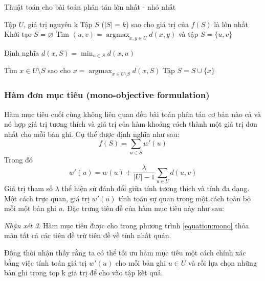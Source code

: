 \documentclass[12pt]{report}
\DeclareMathOperator*{\argmax}{argmax}
\begin{document}
\begin{algorithm}
    \caption{Thuật toán cho bài toán phân tán lớn nhất - nhỏ nhất}
    \label{alg:2}
    \begin{algorithmic}
        \INPUT Tập $U$, giá trị nguyên k 
        \OUTPUT Tập $S$ ($|S|=k$) sao cho giá trị của $f(S)$ là lớn nhất
        \State Khởi tạo $S = \varnothing$
        \State Tìm $(u, v) = \argmax_{x, y \in U} d(x, y)$ 
        và tập $S = \{ u, v\}$

            \State Định nghĩa $d(x, S) = \min_{u \in S} d(x, u)$
        \EndFor

            \State Tìm $x \in U \setminus S$ sao cho
            $x = \argmax_{x \in U \setminus S} d(x, S)$
            \State Tập $S = S \cup \{ x \}$
        \EndWhile
    \end{algorithmic}
\end{algorithm}

\subsubsection{Hàm đơn mục tiêu (mono-objective formulation)}
Hàm mục tiêu cuối cùng không liên quan đến bài toán phân tán cơ bản nào 
cả và nó hợp giá trị tương thích và giá trị của hàm khoảng cách 
thành một giá trị đơn nhất cho mỗi bản ghi.
Cụ thể được định nghĩa như sau: 
\begin{equation}
    \label{equation:mono}
    f(S) = \sum_{u \in S} w'(u)
\end{equation}
Trong đó
$$
w'(u) = w(u) + \frac{\lambda}{|U| - 1}
\sum_{u \in U} d(u, v)
$$
Giá trị tham số $\lambda$ thể hiện sử đánh đổi giữa tính tương thích 
và tính đa dạng. 
Một cách trực quan, giá trị $w'(u)$ tính toán sự quan trọng một cách toàn bộ mỗi một bản ghi $u$. Đặc trưng tiên đề của hàm mục tiêu này như sau:

\textit{Nhận xét 3}. Hàm mục tiêu được cho trong phương trình 
\ref{equation:mono} thỏa mãn tất cả các tiên đề trừ tiên đề về tính 
nhất quán.

Đồng thời nhận thấy rằng ta có thể tối ưu hàm mục tiêu một cách chính xác bằng việc tính toán giá trị $w'(u)$ cho mỗi bản ghi $u \in U$ và rồi lựa chọn những bản ghi trong top k giá trị để cho vào tập kết quả. 

{}

\end{document}
